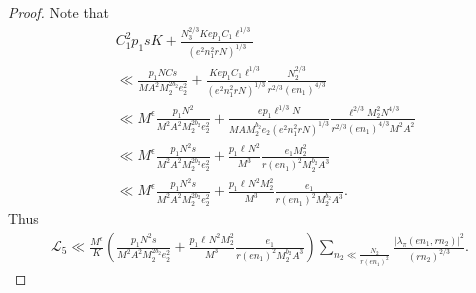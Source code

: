 \documentclass[12pt,a4paper,twoside, reqno]{amsart}
\begin{document}
\begin{proof}
Note that 
\begin{align*}
   & C_1^2p_1sK+ \frac{ N_3^{2/3} K ep_1C_1 \ell^{1/3} } {(e^2n_1^2rN)^{1/3}}  \\
   &\ll \frac{p_1N Cs}{M A^2M_2^{2b_2}e_2^2}+  \frac{  K ep_1C_1 \ell^{1/3} } {(e^2n_1^2rN)^{1/3}} \frac{ N_2^{2/3}}{r^{2/3}(en_1)^{4/3}} \\
    & \ll M^\epsilon\frac{p_1N^2}{M^2 A^2M_2^{2b_2}e_2^2}+  \frac{   ep_1 \ell^{1/3} N} {M AM_2^{b_2}e_2(e^2n_1^2rN)^{1/3}} \frac{\ell^{2/3}M_2^2N^{4/3} }{r^{2/3}(en_1)^{4/3} M^2A^2} \\
      & \ll M^\epsilon \frac{p_1N^2s}{M^2 A^2M_2^{2b_2}e_2^2}+  \frac{   p_1 \ell^{} N^2} {M^3 {}} \frac{e_1 M_2^2 }{r(en_1)^{2} M_2^{b_2}A^3} \\
       & \ll M^\epsilon \frac{p_1N^2s}{M^2 A^2M_2^{2b_2}e_2^2}+  \frac{   p_1 \ell^{} N^2M_2^{2}} {M^3 {}} \frac{e_1  }{r(en_1)^{2} M_2^{b_2}A^3} .
\end{align*}
Thus 
\begin{align*}
     \mathcal{L}_5 \ll \frac{M^\epsilon}{K}  \left(  \frac{p_1N^2s}{M^2 A^2M_2^{2b_2}e_2^2}+  \frac{   p_1 \ell^{} N^2M_2^{2}} {M^3 {}} \frac{e_1  }{r(en_1)^{2} M_2^{b_2}A^3}  \right) \sum_{n_2 \ll   \frac{N_2}{r (en_1)^2}}     \frac{ {|\lambda_\pi(en_1,rn_2)|^2}}{  {(rn_2)^{2/3}}  }.
\end{align*}
\end{proof}  
\end{document}
